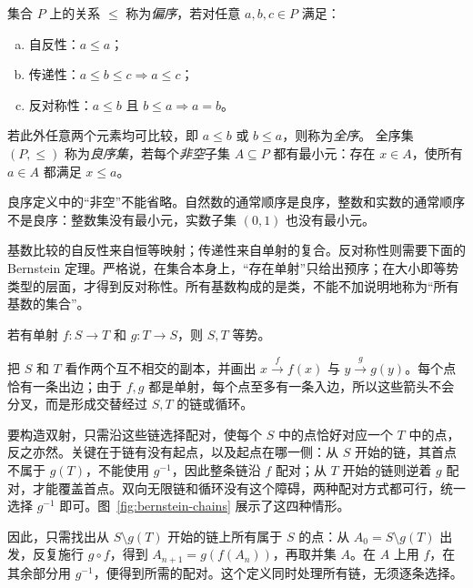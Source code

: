 \documentclass[lang=cn,a4paper,fontset=none,zihao=false,10pt,openany,twoside]{beautybook}
\numberwithin{algorithm}{chapter}
\begin{document}
\begin{definition}
集合 $P$ 上的关系 $\leq$ 称为\emph{偏序}，若对任意 $a,b,c\in P$ 满足：
\begin{enumerate}[(a)]
\item 自反性：$a\leq a$；
\item 传递性：$a\leq b\leq c\Rightarrow a\leq c$；
\item 反对称性：$a\leq b$ 且 $b\leq a\Rightarrow a=b$。
\end{enumerate}
若此外任意两个元素均可比较，即 $a\leq b$ 或 $b\leq a$，则称为\emph{全序}。
全序集 $(P,\leq)$ 称为\emph{良序集}，若每个\emph{非空}子集 $A\subseteq P$ 都有最小元：存在 $x\in A$，使所有 $a\in A$ 都满足 $x\leq a$。
\end{definition}
良序定义中的“非空”不能省略。自然数的通常顺序是良序，整数和实数的通常顺序不是良序：整数集没有最小元，实数子集 $(0,1)$ 也没有最小元。

基数比较的自反性来自恒等映射；传递性来自单射的复合。反对称性则需要下面的 Bernstein 定理。严格说，在集合本身上，“存在单射”只给出预序；在大小即等势类型的层面，才得到反对称性。所有基数构成的是类，不能不加说明地称为“所有基数的集合”。

\begin{theorem}
若有单射 $f:S\to T$ 和 $g:T\to S$，则 $S,T$ 等势。
\end{theorem}

\begin{remark}[构造思路]
把 $S$ 和 $T$ 看作两个互不相交的副本，并画出 $x\xrightarrow{f}f(x)$ 与 $y\xrightarrow{g}g(y)$。每个点恰有一条出边；由于 $f,g$ 都是单射，每个点至多有一条入边，所以这些箭头不会分叉，而是形成交替经过 $S,T$ 的链或循环。

要构造双射，只需沿这些链选择配对，使每个 $S$ 中的点恰好对应一个 $T$ 中的点，反之亦然。关键在于链有没有起点，以及起点在哪一侧：从 $S$ 开始的链，其首点不属于 $g(T)$，不能使用 $g^{-1}$，因此整条链沿 $f$ 配对；从 $T$ 开始的链则逆着 $g$ 配对，才能覆盖首点。双向无限链和循环没有这个障碍，两种配对方式都可行，统一选择 $g^{-1}$ 即可。图~\ref{fig:bernstein-chains} 展示了这四种情形。

因此，只需找出从 $S\setminus g(T)$ 开始的链上所有属于 $S$ 的点：从 $A_0=S\setminus g(T)$ 出发，反复施行 $g\circ f$，得到 $A_{n+1}=g(f(A_n))$，再取并集 $A$。在 $A$ 上用 $f$，在其余部分用 $g^{-1}$，便得到所需的配对。这个定义同时处理所有链，无须逐条选择。
\end{remark}
\end{document}
